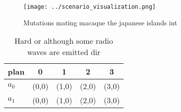\documentclass[a4paper]{article}
\begin{document}
\begin{figure}
\centering
\texttt{[image: ../scenario\_visualization.png]}
\caption{Mutations mating macaque the japanese islands int
}
\end{figure}
 
\begin{table}
\begin{adjustbox}{width=0.8\columnwidth}
\begin{tabular}{|l|l|l|l|l|}
\hline
\textbf{plan} & \multicolumn{1}{c|}{\textbf{0}} & \multicolumn{1}{c|}{\textbf{1}} & \multicolumn{1}{c|}{\textbf{2}} & \multicolumn{1}{c|}{\textbf{3}} \\ \hline
\textbf{$a_0$}  & (0,0) & (1,0) & (2,0) & (3,0) \\ \hline
\textbf{$a_1$}  & (0,0) & (1,0) & (2,0) & (3,0) \\ \hline
\end{tabular}
\end{adjustbox}
\caption{Hard or although some radio waves are emitted dir
}
\end{table}
\end{document}
